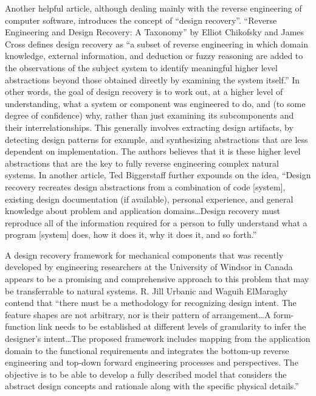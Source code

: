 Another helpful article, although dealing mainly with the reverse
engineering of computer software, introduces the concept of ``design
recovery''. ``Reverse Engineering and Design Recovery: A Taxonomy'' by
Elliot Chikofsky and James Cross defines design recovery as ``a subset
of reverse engineering in which domain knowledge, external information,
and deduction or fuzzy reasoning are added to the observations of the
subject system to identify meaningful higher level abstractions beyond
those obtained directly by examining the system
itself.''\citep{chikofskycross1990}
In other words, the goal of design
recovery is to work out, at a higher level of understanding, what a
system or component was engineered to do, and (to some degree of
confidence) why, rather than just examining its subcomponents and their
interrelationships. This generally involves extracting design
artifacts, by detecting design patterns for example, and synthesizing
abstractions that are less dependent on implementation. The authors
believes that it is these higher level abstractions that are the key to
fully reverse engineering complex natural systems. In another article,
Ted Biggerstaff further expounds on the idea, ``Design recovery
recreates design abstractions from a combination of code [system],
existing design documentation (if available), personal experience, and
general knowledge about problem and application domains{\ldots}Design recovery
must reproduce all of the information required for a person to fully
understand what a program [system] does, how it does it, why it does
it, and so forth.''\citep{biggerstaff1989}

A design recovery framework for mechanical components that was recently
developed by engineering researchers at the University of Windsor in
Canada appears to be a promising and comprehensive approach to this
problem that may be transferrable to natural systems. R. Jill Urbanic
and Waguih ElMaraghy contend that “there must be a methodology for
recognizing design intent. The feature shapes are not arbitrary, nor is
their pattern of arrangement{\ldots}A form-function link needs to be
established at different levels of granularity to infer the designer’s
intent{\ldots}The proposed framework includes mapping from the application
domain to the functional requirements and integrates the bottom-up
reverse engineering and top-down forward engineering processes and
perspectives. The objective is to be able to develop a fully described
model that considers the abstract design concepts and rationale along
with the specific physical details.”\citep{urbanicelmaraghy2009}

